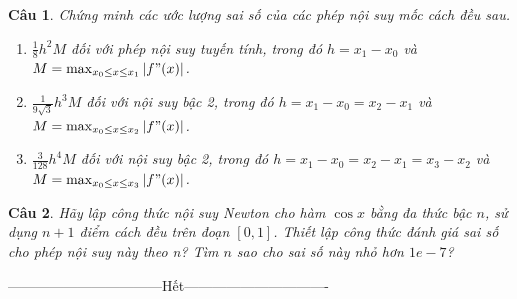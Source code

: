\documentclass[11pt]{article}
\newtheorem{bt}{Câu}
\begin{document}
\begin{bt} Chứng minh các ước lượng sai số của các phép nội suy mốc cách đều sau.
\begin{enumerate}
\item[i)]  $\frac{1}{8}h^2M$ đối với phép nội suy tuyến tính, trong đó $h = x_1-x_0$ và $M = \max_{x_0 \leq x \leq x_1} |f"(x)|$. 
\item[ii)] $\frac{1}{9\sqrt{3}}h^3M$ đối với nội suy bậc 2, trong đó $h = x_1-x_0 = x_2-x_1$ và $M = \max_{x_0 \leq x \leq x_2} |f"(x)|$. 
\item[iii)] $\frac{3}{128} h^4M$ đối với nội suy bậc 2, trong đó $h = x_1-x_0 = x_2-x_1= x_3-x_2$ \linebreak và $M = \max_{x_0 \leq x \leq x_3} |f"(x)|$.
\end{enumerate}	
\end{bt}

\begin{bt} Hãy lập công thức nội suy Newton cho hàm $\cos x$ bằng đa thức bậc $n$, sử dụng $n+1$ điểm cách đều trên đoạn $[0, 1]$. Thiết lập công thức đánh giá sai số cho phép nội suy này theo n? Tìm $n$ sao cho sai số này nhỏ hơn $1e-7$?	
\end{bt}

\centerline{———————————Hết——————————-}
\end{document}
